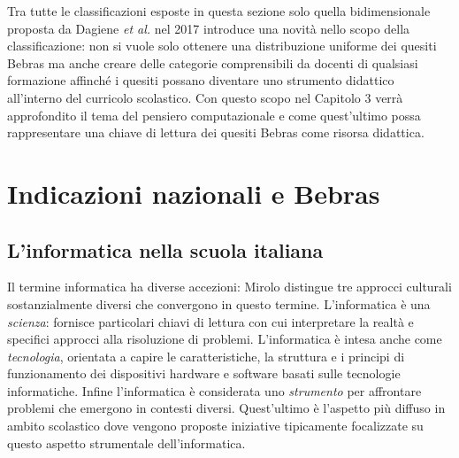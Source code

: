 \documentclass[12pt]{report}
\begin{document}
Tra tutte le classificazioni esposte in questa sezione solo quella bidimensionale proposta da Dagiene \textit{et al.} \cite{DagieneINFORMATICA2017} nel 2017 introduce una novità nello scopo della classificazione: non si vuole solo ottenere una distribuzione uniforme dei quesiti Bebras ma anche creare delle categorie comprensibili da docenti di qualsiasi formazione affinché i quesiti possano diventare uno strumento didattico all'interno del curricolo scolastico.
Con questo scopo nel Capitolo 3 verrà approfondito il tema del pensiero computazionale e come quest'ultimo possa rappresentare una chiave di lettura dei quesiti Bebras come risorsa didattica.
%
%
\chapter{Indicazioni nazionali e Bebras}
\label{cap2}
\section{L'informatica nella scuola italiana}
%
Il termine informatica ha diverse accezioni:  Mirolo \cite{Mirolo2003} distingue tre approcci culturali sostanzialmente diversi che convergono in questo termine.
L'informatica è una \textit{scienza}: fornisce particolari chiavi di lettura con cui interpretare la realtà e specifici approcci alla risoluzione di problemi. 
L'informatica è intesa anche come \textit{tecnologia}, orientata a capire le caratteristiche, la struttura e i principi di funzionamento dei dispositivi hardware e software basati sulle tecnologie informatiche. 
Infine l'informatica è considerata uno \textit{strumento} per affrontare problemi che emergono in contesti diversi. Quest'ultimo è l'aspetto più diffuso in ambito scolastico dove vengono proposte iniziative tipicamente focalizzate su questo aspetto strumentale dell'informatica.
\end{document}
